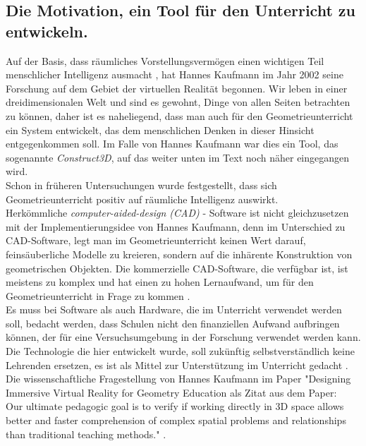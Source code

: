 \documentclass[deutsch]{llncs}
\begin{document}
\subsection{Die Motivation, ein Tool für den Unterricht zu entwickeln.}
Auf der Basis, dass räumliches Vorstellungsvermögen einen wichtigen Teil menschlicher Intelligenz ausmacht \cite{spatial}, hat Hannes Kaufmann im Jahr 2002 seine Forschung auf dem Gebiet der virtuellen Realität begonnen.
Wir leben in einer dreidimensionalen Welt und sind es gewohnt, Dinge von allen Seiten betrachten zu können, daher ist es naheliegend, dass man auch für den Geometrieunterricht ein System entwickelt,
das dem menschlichen Denken in dieser Hinsicht entgegenkommen soll. Im Falle von Hannes Kaufmann war dies ein Tool, das sogenannte \emph{Construct3D}, auf das weiter unten im Text noch näher eingegangen wird. \\
Schon in früheren Untersuchungen wurde festgestellt, dass sich Geometrieunterricht positiv auf räumliche Intelligenz auswirkt. \cite{GittlerDifferentialTO} \\
Herkömmliche  \emph{computer-aided-design (CAD)} - Software ist nicht gleichzusetzen mit der Implementierungsidee von Hannes Kaufmann, denn im Unterschied zu CAD-Software, legt man im Geometrieunterricht 
keinen Wert darauf, feinsäuberliche Modelle zu kreieren, sondern auf die inhärente Konstruktion von geometrischen Objekten. Die kommerzielle CAD-Software, die verfügbar ist, ist meistens zu komplex und hat einen zu hohen Lernaufwand, um für den Geometrieunterricht in Frage zu kommen  \cite{Kaufmann:2002:MGE:1242073.1242086}. \\
Es muss bei Software als auch Hardware, die im Unterricht verwendet werden soll, bedacht werden, dass Schulen nicht den finanziellen Aufwand aufbringen können, der für eine Versuchsumgebung in der Forschung verwendet werden kann.  Die Technologie die hier entwickelt wurde, soll zukünftig selbstverständlich keine Lehrenden ersetzen, es ist als Mittel zur Unterstützung im Unterricht gedacht \cite{article}. \\
Die wissenschaftliche Fragestellung von Hannes Kaufmann im Paper "Designing Immersive Virtual Reality for Geometry Education als Zitat aus dem Paper: \\
Our ultimate pedagogic goal is to verify if working directly in 3D space allows better and faster comprehension of complex spatial problems and relationships than traditional teaching methods." \cite{1667626}. \\
\noindent \\
\end{document}
